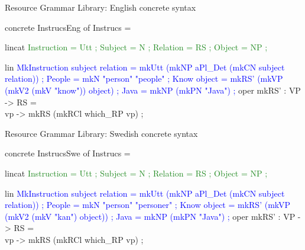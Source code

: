 \begin{frame}[fragile]{Resource Grammar Library: English concrete syntax} \pause
\begin{semiverbatim}
concrete InstrucsEng of Instrucs = {
  lincat\textcolor{ForestGreen}{
    Instruction = \textcolor{Type}{Utt} ;
    Subject = \textcolor{Type}{N} ;
    Relation = \textcolor{Type}{RS} ;
    Object = \textcolor{Type}{NP} ;}\pause

  lin \textcolor{Blue}{
   MkInstruction subject relation = 
            mkUtt (mkNP aPl_Det (mkCN subject relation)) ;
   People = mkN \textcolor{String}{"person" \textcolor{String}{"people"}} ;
   Know object = mkRS' (mkVP (mkV2 (mkV \textcolor{String}{"know"})) object) ;
   Java = mkNP (mkPN \textcolor{String}{\textcolor{String}{"Java"}}) ; }
  oper
     mkRS' : \textcolor{Type}{VP} -> \textcolor{Type}{RS} = \\vp -> mkRS (mkRCl which_RP vp) ;
}
\end{semiverbatim}
\end{frame}

\begin{frame}[fragile]{Resource Grammar Library: Swedish concrete syntax}
\begin{semiverbatim}
concrete InstrucsSwe of Instrucs = {
  lincat\textcolor{ForestGreen}{
    Instruction = \textcolor{Type}{Utt} ;
    Subject = \textcolor{Type}{N} ;
    Relation = \textcolor{Type}{RS} ;
    Object = \textcolor{Type}{NP} ;}

  lin\textcolor{Blue}{
   MkInstruction subject relation = 
            mkUtt (mkNP aPl_Det (mkCN subject relation)) ;
   People = mkN \textcolor{String}{"person" "personer"} ;
   Know object = mkRS' (mkVP (mkV2 (mkV \textcolor{String}{"kan"}) object)) ;
   Java = mkNP (mkPN \textcolor{String}{\textcolor{String}{"Java"}}) ; }
  oper
     mkRS' : \textcolor{Type}{VP} -> \textcolor{Type}{RS} = \\vp -> mkRS (mkRCl which_RP vp) ;
}
\end{semiverbatim}
\end{frame}

\begin{frame}{}
\end{frame}

